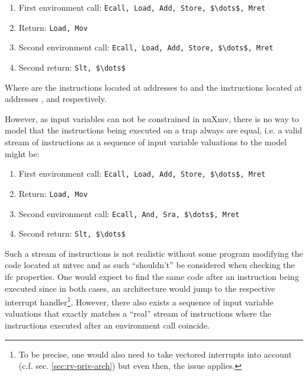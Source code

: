 \begin{enumerate}
    \item First environment call: \lstinline[language=minrv8,mathescape=true]{Ecall, Load, Add, Store, $\dots$, Mret}
    \item Return: \lstinline[language=minrv8,mathescape=true]{Load, Mov}
    \item Second environment call: \lstinline[language=minrv8,mathescape=true]{Ecall, Load, Add, Store, $\dots$, Mret}
    \item Second return: \lstinline[language=minrv8,mathescape=true]{Slt, $\dots$}
\end{enumerate}
Where  are the instructions located at addresses  to  and  the instructions located at addresses ,  and  respectively.

However, as input variables can not be constrained in nuXmv, there is no way to model that the instructions being executed on a trap always are equal, i.e. a valid stream of instructions as a sequence of input variable valuations to the model might be:
\begin{enumerate}
    \item First environment call: \lstinline[language=minrv8,mathescape=true]{Ecall, Load, Add, Store, $\dots$, Mret}
    \item Return: \lstinline[language=minrv8,mathescape=true]{Load, Mov}
    \item Second environment call: \lstinline[language=minrv8,mathescape=true]{Ecall, And, Sra, $\dots$, Mret}
    \item Second return: \lstinline[language=minrv8,mathescape=true]{Slt, $\dots$}
\end{enumerate}

Such a stream of instructions is not realistic without some program modifying the code located at \gls{mtvec} and as such \enquote{shouldn't} be considered when checking the \gls{ifc} properties.
One would expect to find the same code after an  instruction being executed since in both cases, an architecture would jump to the respective interrupt handler\footnote{%
    To be precise, one would also need to take vectored interrupts into account (c.f. sec. \ref{sec:rv-priv-arch}) but even then, the issue applies.
}.
However, there also exists a sequence of input variable valuations that exactly matches a \enquote{real} stream of instructions where the instructions executed after an environment call coincide.

